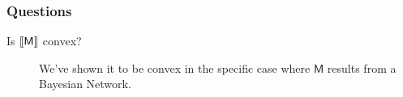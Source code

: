 \documentclass{article}
\newcommand{\sfM}{\mathsf M}
\begin{document}
	\subsubsection*{Questions}
	\begin{description}
		\item [Is $\bbr{\sfM}$ convex?] We've shown it to be convex in the specific case where $\sfM$ results from a Bayesian Network.
	\end{description}
			
	

	
\end{document}
